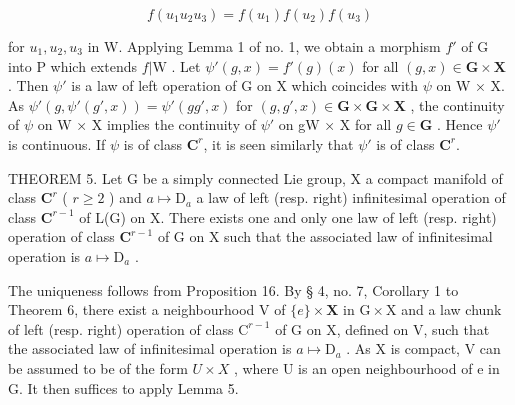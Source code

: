 \[
f \left(u _ {1} u _ {2} u _ {3}\right) = f \left(u _ {1}\right) f \left(u _ {2}\right) f \left(u _ {3}\right)
\]

for \(u_{1}, u_{2}, u_{3}\) in W. Applying Lemma 1 of no. 1, we obtain a morphism \(f'\) of G into P which extends \(f|\mathrm{W}\) . Let \(\psi'(g,x)=f'(g)(x)\) for all \((g,x)\in\mathbf{G}\times\mathbf{X}\) . Then \(\psi'\) is a law of left operation of G on X which coincides with \(\psi\) on W × X. As \(\psi'(g,\psi'(g',x))=\psi'(gg',x)\) for \((g,g',x)\in\mathbf{G}\times\mathbf{G}\times\mathbf{X}\) , the continuity of \(\psi\) on W × X implies the continuity of \(\psi'\) on gW × X for all \(g\in\mathbf{G}\) . Hence \(\psi'\) is continuous. If \(\psi\) is of class \(\mathbf{C}^r\), it is seen similarly that \(\psi'\) is of class \(\mathbf{C}^r\).

THEOREM 5. Let G be a simply connected Lie group, X a compact manifold of class \(\mathbf{C}^r\) ( \(r \geqslant 2\) ) and \(a \mapsto \mathrm{D}_a\) a law of left (resp. right) infinitesimal operation of class \(\mathbf{C}^{r-1}\) of L(G) on X. There exists one and only one law of left (resp. right) operation of class \(\mathbf{C}^{r-1}\) of G on X such that the associated law of infinitesimal operation is \(a \mapsto \mathrm{D}_a\) .

The uniqueness follows from Proposition 16. By § 4, no. 7, Corollary 1 to Theorem 6, there exist a neighbourhood V of \(\{e\} \times \mathbf{X}\) in \(\mathrm{G} \times \mathrm{X}\) and a law chunk of left (resp. right) operation of class \(\mathrm{C}^{r-1}\) of G on X, defined on V, such that the associated law of infinitesimal operation is \(a \mapsto \mathrm{D}_a\) . As X is compact, V can be assumed to be of the form \(U \times X\) , where U is an open neighbourhood of e in G. It then suffices to apply Lemma 5.
\relax{}
